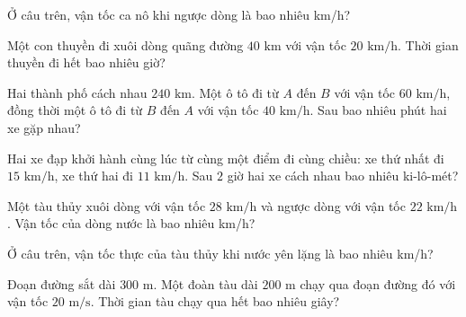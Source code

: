 \begin{ex}
  Ở câu trên, vận tốc ca nô khi ngược dòng là bao nhiêu km/h?
\end{ex}

\begin{ex}
  Một con thuyền đi xuôi dòng quãng đường $40\text{ km}$ với vận tốc $20\text{ km/h}$. Thời gian thuyền đi hết bao nhiêu giờ?
\end{ex}

\begin{ex}
  Hai thành phố cách nhau $240\text{ km}$. Một ô tô đi từ $A$ đến $B$ với vận tốc $60\text{ km/h}$, đồng thời một ô tô đi từ $B$ đến $A$ với vận tốc $40\text{ km/h}$. Sau bao nhiêu phút hai xe gặp nhau?
\end{ex}

\begin{ex}
  Hai xe đạp khởi hành cùng lúc từ cùng một điểm đi cùng chiều: xe thứ nhất đi $15\text{ km/h}$, xe thứ hai đi $11\text{ km/h}$. Sau $2$ giờ hai xe cách nhau bao nhiêu ki-lô-mét?
\end{ex}

\begin{ex}
  Một tàu thủy xuôi dòng với vận tốc $28\text{ km/h}$ và ngược dòng với vận tốc $22\text{ km/h}$. Vận tốc của dòng nước là bao nhiêu km/h?
\end{ex}

\begin{ex}
  Ở câu trên, vận tốc thực của tàu thủy khi nước yên lặng là bao nhiêu km/h?
\end{ex}

\begin{ex}
  Đoạn đường sắt dài $300\text{ m}$. Một đoàn tàu dài $200\text{ m}$ chạy qua đoạn đường đó với vận tốc $20\text{ m/s}$. Thời gian tàu chạy qua hết bao nhiêu giây?
\end{ex}

